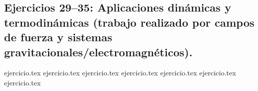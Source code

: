\subsection*{Ejercicios 29--35: Aplicaciones dinámicas y termodinámicas (trabajo realizado por campos de fuerza y sistemas gravitacionales/electromagnéticos).}
\begin{enumerate}
    \setcounter{enumi}{28}
    {ejercicio.tex}
    {ejercicio.tex}
    {ejercicio.tex}
    {ejercicio.tex}
    {ejercicio.tex}
    {ejercicio.tex}
    {ejercicio.tex}
\end{enumerate}
